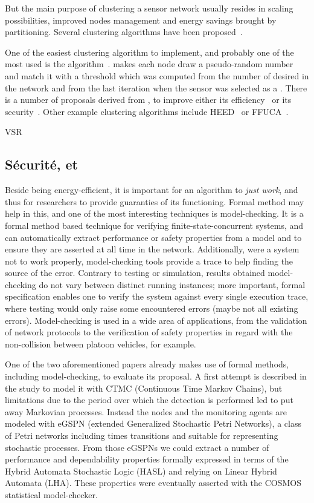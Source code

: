 \bigskip
But the main purpose of clustering a sensor network usually resides in scaling possibilities, improved nodes management and energy savings brought by partitioning.
Several clustering algorithms have been proposed~\cite{AY07}.

One of the easiest clustering algorithm to implement, and probably one of the most used is the \leach algorithm~\cite{HHT02}.
\leach makes each node draw a pseudo-random number and match it with a threshold which was computed from the number of desired \chs in the network and from the last iteration when the sensor was selected as a \CH.
There is a number of proposals derived from \leach, to improve either its efficiency~\cite{RR13,CJ14} or its security~\cite{OFVWBDL07}.
Other example clustering algorithms include HEED~\cite{YF04} or FFUCA~\cite{FMMMI12}.

VSR\cite{TV08}

        \subsection{Sécurité,  et \resilience}



Beside being energy-efficient, it is important for an algorithm to \emph{just work}, and thus for researchers to provide guaranties of its functioning.
Formal method may help in this, and one of the most interesting techniques is model-checking.
It is a formal method based technique for verifying finite-state-concurrent systems, and can automatically extract performance or safety properties from a model and to ensure they are asserted at all time in the network.
Additionally, were a system not to work properly, model-checking tools provide a trace to help finding the source of the error.
Contrary to testing or simulation, results obtained \via model-checking do not vary between distinct running instances; more important, formal specification enables one to verify the system against every single execution trace, where testing would only raise some encountered errors (maybe not all existing errors).
Model-checking is used in a wide area of applications, from the validation of network protocols to the verification of safety properties in regard with the non-collision between platoon vehicles\cite{E-ZCGGK12}, for example.

One of the two aforementioned papers already makes use of formal methods, including model-checking, to evaluate its proposal\cite{BMM13}.
A first attempt is described in the study to model it with CTMC (Continuous Time Markov Chains), but limitations due to the period over which the detection is performed led to put away Markovian processes.
Instead the nodes and the monitoring agents are modeled with eGSPN (extended Generalized Stochastic Petri Networks), a class of Petri networks including times transitions and suitable for representing stochastic processes.
From those eGSPNs we could extract a number of performance and dependability properties formally expressed in terms of the Hybrid Automata Stochastic Logic (HASL\cite{BDDHP11hasl}) and relying on Linear Hybrid Automata (LHA).
These properties were eventually asserted with the COSMOS statistical model-checker\cite{BDDHP11cosmos}.

